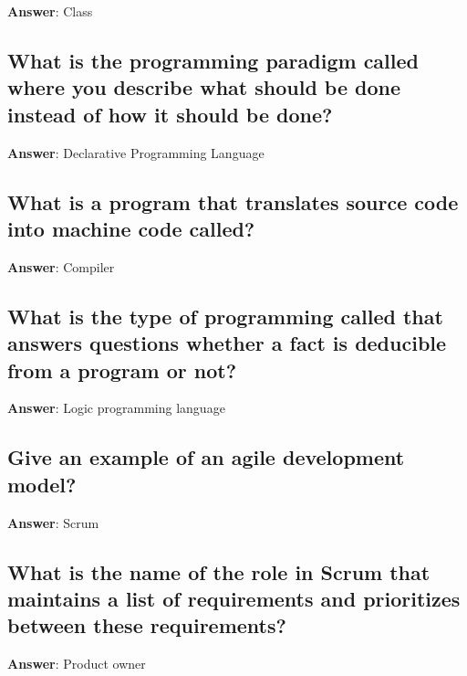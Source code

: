 \documentclass[a4paper,11pt,oneside]{article}
\begin{document}
\begin{sloppypar}
\label{q:36:sa:en:True}

\textbf{Answer}: Class



\subsection{What is the programming paradigm called where you describe what should be done instead of how it should be done?}

\label{q:37:sa:en:True}

\textbf{Answer}: Declarative Programming Language



\subsection{What is a program that translates source code into machine code called?}

\label{q:38:sa:en:True}

\textbf{Answer}: Compiler



\subsection{What is the type of programming called that answers questions whether a fact is deducible from a program or not?}

\label{q:39:sa:en:True}

\textbf{Answer}: Logic programming language



\subsection{Give an example of an agile development model?}

\label{q:40:sa:en:True}

\textbf{Answer}: Scrum



\subsection{What is the name of the role in Scrum that maintains a list of requirements and prioritizes between these requirements?}

\label{q:41:sa:en:True}

\textbf{Answer}: Product owner




\end{sloppypar}
\end{document}
